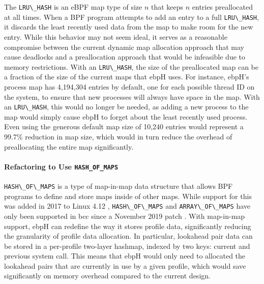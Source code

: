 \documentclass[
  12pt]{findlay}
\newcommand{\passthrough}[1]{#1}
\begin{document}
The \passthrough{\lstinline!LRU\_HASH!} \autocite{bcc,gregg19bpf} is an
eBPF map type of size \(n\) that keeps \(n\) entries preallocated at all
times. When a BPF program attempts to add an entry to a full
\passthrough{\lstinline!LRU\_HASH!}, it discards the least recently used
data from the map to make room for the new entry. While this behavior
may not seem ideal, it serves as a reasonable compromise between the
current dynamic map allocation approach that may cause deadlocks and a
preallocation approach that would be infeasible due to memory
restrictions. With an \passthrough{\lstinline!LRU\_HASH!}, the size of
the preallocated map can be a fraction of the size of the current maps
that ebpH uses. For instance, ebpH's process map has 4,194,304 entries
by default, one for each possible thread ID on the system, to ensure
that new processes will always have space in the map. With an
\passthrough{\lstinline!LRU\_HASH!}, this would no longer be needed, as
adding a new process to the map would simply cause ebpH to forget about
the least recently used process. Even using the generous default map
size of 10,240 entries would represent a 99.7\% reduction in map size,
which would in turn reduce the overhead of preallocating the entire map
significantly.

\hypertarget{refactoring-to-use-hash_of_maps}{%
\paragraph{\texorpdfstring{Refactoring to Use
\texttt{HASH\_OF\_MAPS}}{Refactoring to Use HASH\_OF\_MAPS}}\label{refactoring-to-use-hash_of_maps}}

\passthrough{\lstinline!HASH\_OF\_MAPS!} \autocite{bcc,gregg19bpf} is a
type of map-in-map data structure that allows BPF programs to define and
store maps inside of other maps. While support for this was added in
2017 to Linux 4.12 \autocite{lau17},
\passthrough{\lstinline!HASH\_OF\_MAPS!} and
\passthrough{\lstinline!ARRAY\_OF\_MAPS!} have only been supported in
bcc \autocite{bcc} since a November 2019 patch \autocite{song19}. With
map-in-map support, ebpH can redefine the way it stores profile data,
significantly reducing the granularity of profile data allocation. In
particular, lookahead pair data can be stored in a per-profile two-layer
hashmap, indexed by two keys: current and previous system call. This
means that ebpH would only need to allocated the lookahead pairs that
are currently in use by a given profile, which would save significantly
on memory overhead compared to the current design.
\end{document}
